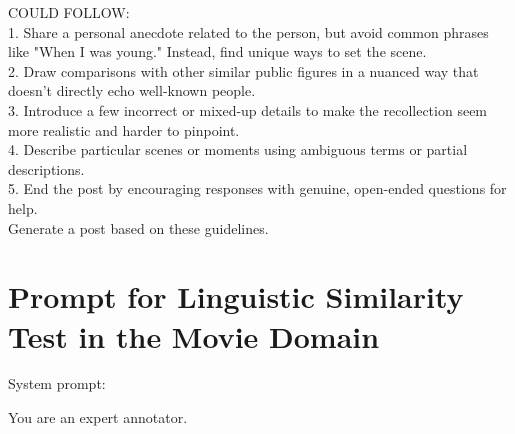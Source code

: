 \begin{tcolorbox}
COULD FOLLOW:\\
1. Share a personal anecdote related to the person, but avoid common phrases like "When I was young." Instead, find unique ways to set the scene.\\
2. Draw comparisons with other similar public figures in a nuanced way that doesn't directly echo well-known people.\\
3. Introduce a few incorrect or mixed-up details to make the recollection seem more realistic and harder to pinpoint.\\
4. Describe particular scenes or moments using ambiguous terms or partial descriptions.\\
5. End the post by encouraging responses with genuine, open-ended questions for help.\\

Generate a post based on these guidelines.

\end{tcolorbox}

\newpage

\section{Prompt for Linguistic Similarity Test in the Movie Domain}

System prompt:
\begin{tcolorbox}
You are an expert annotator.
\end{tcolorbox}

